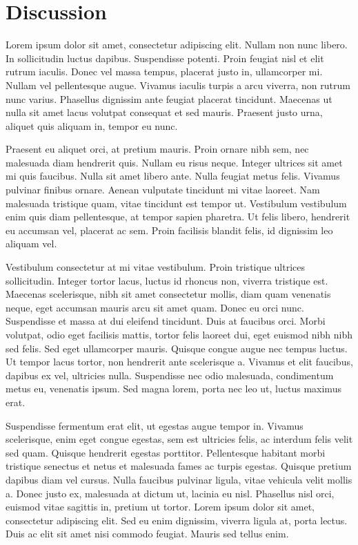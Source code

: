 \section{Discussion}

 Lorem ipsum dolor sit amet, consectetur adipiscing elit. Nullam non nunc libero. In sollicitudin luctus dapibus. Suspendisse potenti. Proin feugiat nisl et elit rutrum iaculis. Donec vel massa tempus, placerat justo in, ullamcorper mi. Nullam vel pellentesque augue. Vivamus iaculis turpis a arcu viverra, non rutrum nunc varius. Phasellus dignissim ante feugiat placerat tincidunt. Maecenas ut nulla sit amet lacus volutpat consequat et sed mauris. Praesent justo urna, aliquet quis aliquam in, tempor eu nunc.

Praesent eu aliquet orci, at pretium mauris. Proin ornare nibh sem, nec malesuada diam hendrerit quis. Nullam eu risus neque. Integer ultrices sit amet mi quis faucibus. Nulla sit amet libero ante. Nulla feugiat metus felis. Vivamus pulvinar finibus ornare. Aenean vulputate tincidunt mi vitae laoreet. Nam malesuada tristique quam, vitae tincidunt est tempor ut. Vestibulum vestibulum enim quis diam pellentesque, at tempor sapien pharetra. Ut felis libero, hendrerit eu accumsan vel, placerat ac sem. Proin facilisis blandit felis, id dignissim leo aliquam vel.

Vestibulum consectetur at mi vitae vestibulum. Proin tristique ultrices sollicitudin. Integer tortor lacus, luctus id rhoncus non, viverra tristique est. Maecenas scelerisque, nibh sit amet consectetur mollis, diam quam venenatis neque, eget accumsan mauris arcu sit amet quam. Donec eu orci nunc. Suspendisse et massa at dui eleifend tincidunt. Duis at faucibus orci. Morbi volutpat, odio eget facilisis mattis, tortor felis laoreet dui, eget euismod nibh nibh sed felis. Sed eget ullamcorper mauris. Quisque congue augue nec tempus luctus. Ut tempor lacus tortor, non hendrerit ante scelerisque a. Vivamus et elit faucibus, dapibus ex vel, ultricies nulla. Suspendisse nec odio malesuada, condimentum metus eu, venenatis ipsum. Sed magna lorem, porta nec leo ut, luctus maximus erat.

Suspendisse fermentum erat elit, ut egestas augue tempor in. Vivamus scelerisque, enim eget congue egestas, sem est ultricies felis, ac interdum felis velit sed quam. Quisque hendrerit egestas porttitor. Pellentesque habitant morbi tristique senectus et netus et malesuada fames ac turpis egestas. Quisque pretium dapibus diam vel cursus. Nulla faucibus pulvinar ligula, vitae vehicula velit mollis a. Donec justo ex, malesuada at dictum ut, lacinia eu nisl. Phasellus nisl orci, euismod vitae sagittis in, pretium ut tortor. Lorem ipsum dolor sit amet, consectetur adipiscing elit. Sed eu enim dignissim, viverra ligula at, porta lectus. Duis ac elit sit amet nisi commodo feugiat. Mauris sed tellus enim. 